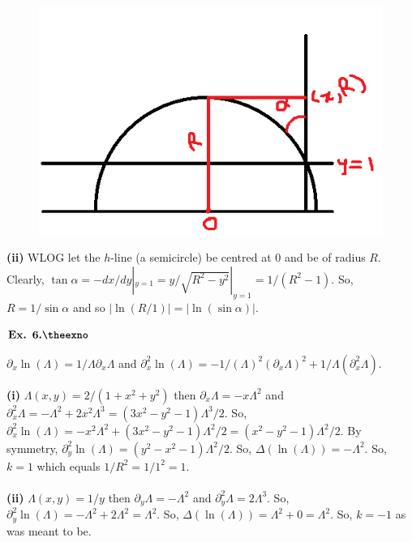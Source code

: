 \documentclass{article}
\def\tf{\textbf}
\newcounter{exno}
\begin{document}
\begin{figure}[h!]
    \centering
    \includegraphics[scale=0.7]{6_16}
    \label{6_16}
\end{figure}

\tf{(ii)} WLOG let the $h$-line (a semicircle) be centred at $0$ and be of radius $R$. Clearly, $\tan\alpha = -dx/dy|_{y=1} = y/\sqrt{R^2-y^2}|_{y=1} = 1/(R^2-1)$. So, $R = 1/\sin\alpha$ and so $|\ln(R/1)| = |\ln(\sin\alpha)|$.

\vspace{0.2in}

${\textbf{Ex. 6.\theexno}}$
\addtocounter{exno}{1}

$\partial_{x}\ln(\Lambda) = 1/\Lambda \partial_x\Lambda$ and $\partial_{x}^{2}\ln(\Lambda) = -1/(\Lambda)^2(\partial_{x}\Lambda)^2 + 1/\Lambda(\partial_{x}^{2}\Lambda)$.

\tf{(i)} $\Lambda(x,y)=2/(1+x^2+y^2)$ then $\partial_{x}\Lambda =-x \Lambda^2$ and $\partial_x^2 \Lambda = -\Lambda^2 +2x^2\Lambda^3 = (3x^2-y^2-1)\Lambda^3/2$. So, $\partial_{x}^{2}\ln(\Lambda) = -x^2\Lambda^2 + (3x^2-y^2-1)\Lambda^2/2 = (x^2-y^2-1)\Lambda^2/2$. By symmetry, $\partial_{y}^{2}\ln(\Lambda) = (y^2-x^2-1)\Lambda^2/2$. So, $\Delta(\ln(\Lambda)) = -\Lambda^2$. So, $k = 1$ which equals $1/R^2=1/1^2 = 1$.\\~\\

\tf{(ii)} $\Lambda(x,y) = 1/y$ then $\partial_{y}\Lambda = -\Lambda^2$ and $\partial_{y}^{2}\Lambda = 2\Lambda^3$. So, $\partial_{y}^2\ln(\Lambda) = -\Lambda^2 +2\Lambda^2 = \Lambda^2$. So, $\Delta(\ln(\Lambda)) = \Lambda^2 + 0 = \Lambda^2$. So, $k=-1$ as was meant to be.\\~\\
\end{document}
